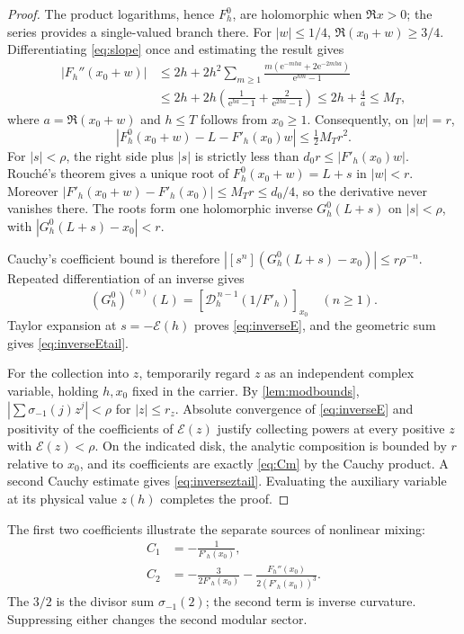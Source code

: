 \documentclass[11pt,a4paper]{article}
\theoremstyle{definition}
\theoremstyle{remark}
\newcommand{\e}{\mathrm e}
\newcommand{\Ecal}{\mathcal E}
\newcommand{\Dcal}{\mathcal D}
\begin{document}
\begin{proof}
The product logarithms, hence $F_h^0$, are holomorphic when $\Re x>0$;
the series provides a single-valued branch there. For $|w|\le1/4$,
$\Re(x_0+w)\ge3/4$. Differentiating \eqref{eq:slope} once and estimating the result gives
\begin{align*}
 |F_h''(x_0+w)|
 &\le 2h+2h^2\sum_{m\ge1}
     \frac{m(\e^{-mh a}+2\e^{-2mh a})}{\e^{hm}-1}\\
 &\le2h+2h\left(\frac1{\e^{ha}-1}
                    +\frac2{\e^{2ha}-1}\right)
 \le2h+\frac4a\le M_T,
\end{align*}
where $a=\Re(x_0+w)$ and $h\le T$ follows from $x_0\ge1$.
Consequently, on $|w|=r$,
\[
 |F_h^0(x_0+w)-L-F'_h(x_0)w|\le\tfrac12M_Tr^2.
\]
For $|s|<\rho$, the right side plus $|s|$ is strictly less than
$d_0r\le|F'_h(x_0)w|$. Rouch\'e's theorem gives a unique root of
$F_h^0(x_0+w)=L+s$ in $|w|<r$.
Moreover $|F'_h(x_0+w)-F'_h(x_0)|\le M_Tr\le d_0/4$,
so the derivative never vanishes there. The roots form one holomorphic
inverse $G_h^0(L+s)$ on $|s|<\rho$, with
$|G_h^0(L+s)-x_0|<r$.

Cauchy's coefficient bound is therefore
$|[s^n](G_h^0(L+s)-x_0)|\le r\rho^{-n}$.
Repeated differentiation of an inverse gives
\[
 (G_h^0)^{(n)}(L)
 =\left[\Dcal_h^{\,n-1}(1/F'_h)\right]_{x_0}\quad(n\ge1).
\]
Taylor expansion at $s=-\Ecal(h)$ proves \eqref{eq:inverseE}, and the
geometric sum gives \eqref{eq:inverseEtail}.

For the collection into $z$, temporarily regard $z$ as an independent
complex variable, holding $h,x_0$ fixed in the carrier. By
\cref{lem:modbounds}, $|\sum\sigma_{-1}(j)z^j|<\rho$ for $|z|\le r_z$.
Absolute convergence of \eqref{eq:inverseE} and positivity of the
coefficients of $\Ecal(z)$ justify collecting powers at every positive
$z$ with $\Ecal(z)<\rho$. On the indicated disk, the analytic composition
is bounded by $r$ relative to $x_0$, and its coefficients are exactly \eqref{eq:Cm} by the Cauchy product. A second
Cauchy estimate gives \eqref{eq:inverseztail}. Evaluating the auxiliary
variable at its physical value $z(h)$ completes the proof.
\end{proof}

The first two coefficients illustrate the separate sources of nonlinear
mixing:
\begin{align}
 C_1&=-\frac1{F'_h(x_0)},\label{eq:C1}\\
 C_2&=-\frac{3}{2F'_h(x_0)}
      -\frac{F_h''(x_0)}{2(F'_h(x_0))^3}.
 \label{eq:C2}
\end{align}
The $3/2$ is the divisor sum $\sigma_{-1}(2)$; the second term is inverse
curvature. Suppressing either changes the second modular sector.
\end{document}
